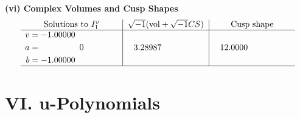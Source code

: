 \documentclass[1p]{elsarticle_modified}
\theoremstyle{definition}
\newcommand{\I}{\sqrt{-1}}
\begin{document}
\newpage\flushleft \textbf{(vi) Complex Volumes and Cusp Shapes}
$$\begin{array}{c|c|c}  
\text{Solutions to }I^v_{1}& \I (\text{vol} + \sqrt{-1}CS) & \text{Cusp shape}\\
 \hline 
\begin{aligned}
v &= -1.00000\phantom{ +0.000000I} \\
a &= \phantom{-0.000000 } 0 \\
b &= -1.00000\phantom{ +0.000000I}\end{aligned}
 & \phantom{-}3.28987\phantom{ +0.000000I} & \phantom{-}12.0000\phantom{ +0.000000I}\\
 \hline 
 \end{array}$$\newpage
\newpage\renewcommand{\arraystretch}{1}
\centering \section*{ VI. u-Polynomials}
\end{document}
